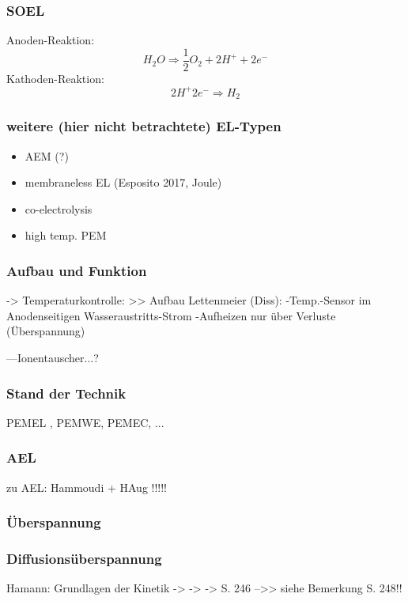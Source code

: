\documentclass[onecolumn,10pt,titlepage]{article}
\begin{document}
\subsubsection{SOEL}
Anoden-Reaktion:
\begin{equation}\label{Teilreakt_Anode_SOEL}
H_2O \Rightarrow \frac{1}{2} O_2 + 2H^+ +2e^-
\end{equation}
Kathoden-Reaktion:
\begin{equation}\label{Teilreakt-Kathode_SOEL}
2H^+ 2e^- \Rightarrow H_2
\end{equation}

\subsubsection{weitere (hier nicht betrachtete) EL-Typen}
\begin{itemize}
	\item AEM (?) %
	\item membraneless EL (Esposito 2017, Joule)
	\item co-electrolysis
	\item high temp. PEM
\end{itemize}



\subsubsection{Aufbau und Funktion}


-> Temperaturkontrolle:
>> Aufbau Lettenmeier (Diss):
-Temp.-Sensor im Anodenseitigen Wasseraustritts-Strom
-Aufheizen nur über Verluste (Überspannung)

---Ionentauscher...?

\subsubsection{Stand der Technik}
\label{SdT}
PEMEL , PEMWE, PEMEC, ...

\subsubsection{AEL}
zu AEL: Hammoudi + HAug !!!!!

\subsubsection{Überspannung}

\subsubsection*{Diffusionsüberspannung}
Hamann: Grundlagen der Kinetik
-> 
-> 
-> S. 246
-->> siehe Bemerkung S. 248!!
\end{document}
